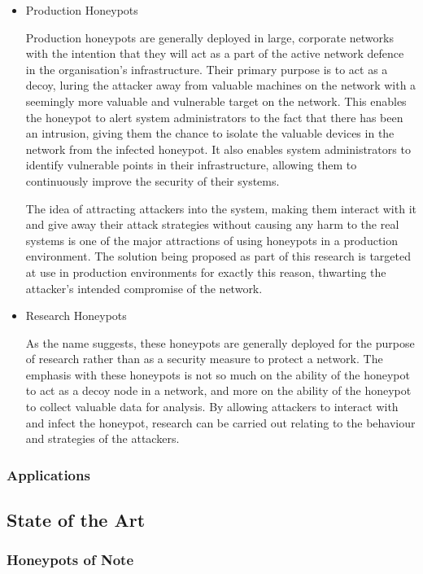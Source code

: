 \begin{itemize}
\item Production Honeypots

Production honeypots are generally deployed in large, corporate networks with the intention that they will act as a part of the active network defence in the organisation’s infrastructure. Their primary purpose is to act as a decoy, luring the attacker away from valuable machines on the network with a seemingly more valuable and vulnerable target on the network. This enables the honeypot to alert system administrators to the fact that there has been an intrusion, giving them the chance to isolate the valuable devices in the network from the infected honeypot. It also enables system administrators to identify vulnerable points in their infrastructure, allowing them to continuously improve the security of their systems. 

The idea of attracting attackers into the system, making them interact with it and give away their attack strategies without causing any harm to the real systems is one of the major attractions of using honeypots in a production environment. The solution being proposed as part of this research is targeted at use in production environments for exactly this reason, thwarting the attacker’s intended compromise of the network.


\item Research Honeypots

As the name suggests, these honeypots are generally deployed for the purpose of research rather than as a security measure to protect a network. The emphasis with these honeypots is not so much on the ability of the honeypot to act as a decoy node in a network, and more on the ability of the honeypot to collect valuable data for analysis. By allowing attackers to interact with and infect the honeypot, research can be carried out relating to the behaviour and strategies of the attackers.

\end{itemize}

\subsubsection{Applications}

\subsection{State of the Art}

\subsubsection{Honeypots of Note}

